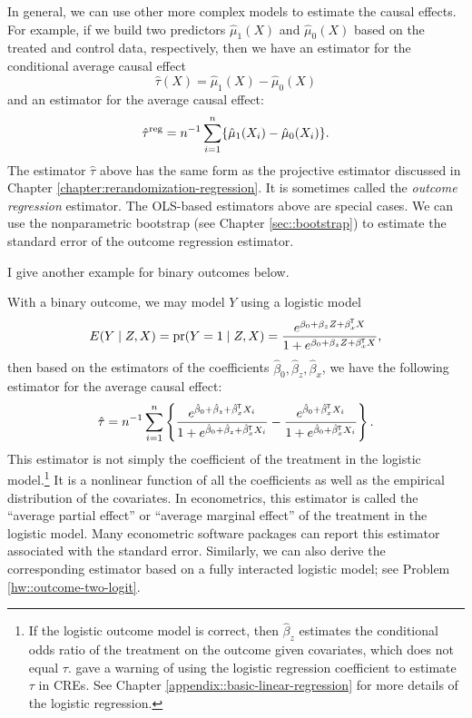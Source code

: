In general, we can use other more complex models to estimate the causal effects. For example, if we build two predictors $\hat{\mu}_1(X)$ and $\hat{\mu}_0(X)$ based on the treated and control data, respectively, then we have an estimator for the conditional average causal effect 
$$
\hat\tau(X) = \hat{\mu}_1(X) - \hat{\mu}_0(X)
$$
and an estimator for the average causal effect: 
$$
\hat{\tau}^{\text{reg}} = n^{-1} \sum_{i=1}^n \{ \hat{\mu}_1(X_i) - \hat{\mu}_0(X_i) \}  . 
$$
The estimator $\hat{\tau} $ above has the same form as the projective estimator discussed in Chapter \ref{chapter:rerandomization-regression}. It is sometimes called the {\it outcome regression} estimator. The OLS-based estimators above are special cases. We can use the nonparametric bootstrap (see Chapter \ref{sec::bootstrap}) to estimate the standard error of the outcome regression estimator. 


I give another example for binary outcomes below. 

 \begin{example}
 \label{eg::reg-binary}
 With a binary outcome, we may model $Y$ using a logistic model
$$
E(Y\mid Z, X) = \textup{pr}(Y =1\mid Z, X) = \frac{   e^{\beta_0 + \beta_z Z + \beta_x ^{\mkern-1.5mu\mathsf{T}} X}  }
{ 1+ e^{\beta_0 + \beta_z Z + \beta_x ^{\mkern-1.5mu\mathsf{T}} X} } ,
$$
then based on the estimators of the coefficients $ \hat \beta_0, \hat \beta_z, \hat{\beta}_x $, we have the following estimator for the average causal effect: 
$$
\hat{\tau} = n^{-1} \sum_{i=1}^n \left\{  
\frac{   e^{\hat\beta_0 +\hat \beta_z + \hat\beta_x ^{\mkern-1.5mu\mathsf{T}} X_i}  }
{ 1+ e^{\hat\beta_0 +\hat \beta_z  + \hat\beta_x ^{\mkern-1.5mu\mathsf{T}} X_i} }  
- \frac{   e^{\hat\beta_0 + \hat\beta_x ^{\mkern-1.5mu\mathsf{T}} X_i}  }
{ 1+ e^{\hat\beta_0   + \hat\beta_x ^{\mkern-1.5mu\mathsf{T}} X_i} } 
\right \}  . 
$$
This estimator is not simply the coefficient of the treatment in the logistic  model.\footnote{If the logistic outcome model is correct, then $\hat\beta_z$ estimates the conditional odds ratio of the treatment on the outcome given covariates, which does not equal $\tau$. 
\citet{freedman2008randomization} gave a warning of using the logistic regression coefficient to estimate $\tau$ in CREs.
See Chapter \ref{appendix::basic-linear-regression} for more details of the logistic regression.} It is a nonlinear function of all the coefficients as well as the empirical distribution of the covariates. In econometrics, this estimator is called the  ``average partial effect'' or ``average marginal effect'' of the treatment in the logistic model. Many econometric software packages can report this estimator associated with the standard error.  Similarly, we can also derive the corresponding estimator based on a fully interacted logistic model; see Problem \ref{hw::outcome-two-logit}. 
 \end{example}





